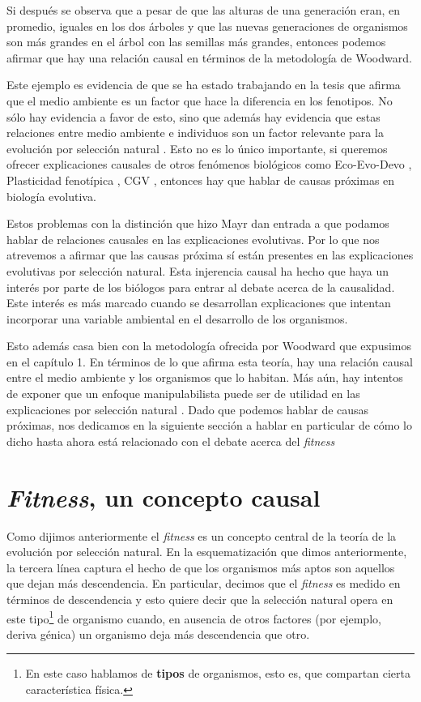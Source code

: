 Si después se observa que a pesar de que las alturas de una generación eran, en promedio, iguales en los dos árboles y que las nuevas generaciones de organismos son más grandes en el árbol con las semillas más grandes, entonces podemos afirmar que hay una relación causal en términos de la metodología de Woodward.

Este ejemplo es evidencia de que se ha estado trabajando en la tesis que afirma que el medio ambiente es un factor que hace la diferencia en los fenotipos. No sólo hay evidencia a favor de esto, sino que además hay evidencia que estas relaciones entre medio ambiente e individuos son un factor relevante para la evolución por selección natural \cite{Jablonka2020, Dayan2020, MacColl2011}. Esto no es lo único importante, si queremos ofrecer explicaciones causales de otros fenómenos biológicos como Eco-Evo-Devo \cite{PfenningEco-Evo-Devo}, Plasticidad fenotípica \cite{WESTEBERHARD20082701}, CGV \cite{CVG}, entonces hay que hablar de causas próximas en biología evolutiva.

Estos problemas con la distinción que hizo Mayr dan entrada a que podamos hablar de relaciones causales en las explicaciones evolutivas. Por lo que nos atrevemos a afirmar que las causas próxima sí están presentes en las explicaciones evolutivas por selección natural. Esta injerencia causal ha hecho que haya un interés por parte de los biólogos para entrar al debate acerca de la causalidad. Este interés es más marcado cuando se desarrollan explicaciones que intentan incorporar una variable ambiental en el desarrollo de los organismos.

Esto además casa bien con la metodología ofrecida por Woodward que expusimos en el capítulo 1. En términos de lo que afirma esta teoría, hay una relación causal entre el medio ambiente y los organismos que lo habitan. Más aún, hay intentos de exponer que un enfoque manipulabilista puede ser de utilidad en las explicaciones por selección natural \cite{MacColl2011}. Dado que podemos hablar de causas próximas, nos dedicamos en la siguiente sección a hablar en particular de cómo lo dicho hasta ahora está relacionado con el debate acerca del \emph{fitness}

\section{\emph{Fitness}, un concepto causal}

\noindent Como dijimos anteriormente el \emph{fitness} es un concepto central de la teoría de la evolución por selección natural. En la esquematización que dimos anteriormente, la tercera línea captura el hecho de que los organismos más aptos son aquellos que dejan más descendencia. En particular, decimos que el \emph{fitness} es medido en términos de descendencia y esto quiere decir que la selección natural opera en este tipo\footnote{En este caso hablamos de \textbf{tipos} de organismos, esto es, que compartan cierta característica física.} de organismo cuando, en ausencia de otros factores (por ejemplo, deriva génica) un organismo deja más descendencia que otro.


